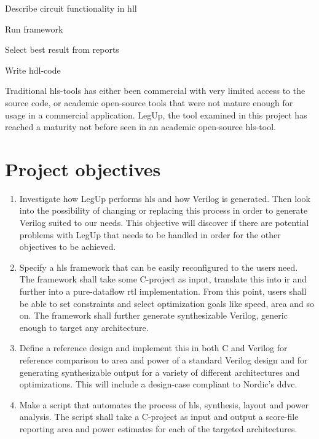 \begin{compactenum}
    \item Describe circuit functionality in \gls{hll}
    \item Run framework
    \item Select best result from reports
    \item Write \gls{hdl}-code
\end{compactenum}
Traditional \gls{hls}-tools has either been commercial with very limited access to the source code, or academic open-source tools that were not mature enough for usage in a commercial application. LegUp, the tool examined in this project has reached a maturity not before seen in an academic open-source \gls{hls}-tool.
\section{Project objectives}
\begin{enumerate}
    \item Investigate how LegUp performs \gls{hls} and how Verilog is generated. Then look into the possibility of changing or replacing this process in order to generate Verilog suited to our needs. This objective will discover if there are potential problems with LegUp that needs to be handled in order for the other objectives to be achieved.
    \item Specify a \gls{hls} framework that can be easily reconfigured to the users need. The framework shall take some C-project as input, translate this into \gls{ir} and further into a pure-dataflow \gls{rtl} implementation. From this point, users shall be able to set constraints and select optimization goals like speed, area and so on. The framework shall further generate synthesizable Verilog, generic enough to target any architecture.
    \item Define a reference design and implement this in both C and Verilog for reference comparison to area and power of a standard Verilog design and for generating synthesizable output for a variety of different architectures and optimizations. This will include a design-case compliant to Nordic’s \gls{ddvc}.
    \item Make a script that automates the process of \gls{hls}, synthesis, layout and power analysis. The script shall take a C-project as input and output a score-file reporting area and power estimates for each of the targeted architectures.
\end{enumerate}